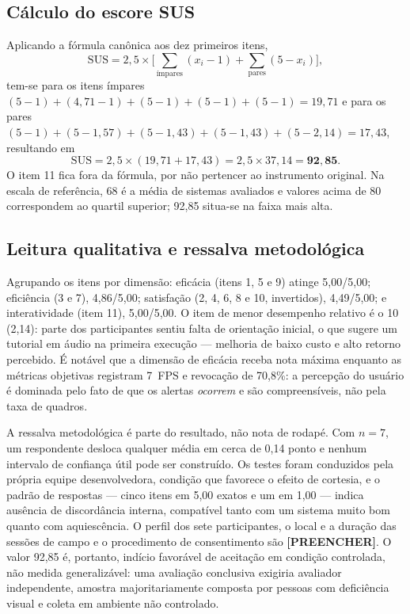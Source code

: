 \documentclass[12pt]{article}
\begin{document}
\subsection{Cálculo do escore SUS}

Aplicando a fórmula canônica aos dez primeiros itens,
\begin{equation}
\mathrm{SUS} = 2{,}5 \times \Big[ \sum_{\text{ímpares}} (x_i - 1)
+ \sum_{\text{pares}} (5 - x_i) \Big],
\end{equation}
tem-se para os itens ímpares
$(5-1)+(4{,}71-1)+(5-1)+(5-1)+(5-1) = 19{,}71$ e para os pares
$(5-1)+(5-1{,}57)+(5-1{,}43)+(5-1{,}43)+(5-2{,}14) = 17{,}43$, resultando em
\begin{equation}
\mathrm{SUS} = 2{,}5 \times (19{,}71 + 17{,}43) = 2{,}5 \times 37{,}14 = \mathbf{92{,}85}.
\end{equation}
O item 11 fica fora da fórmula, por não pertencer ao instrumento original. Na
escala de referência, 68 é a média de sistemas avaliados e valores acima de 80
correspondem ao quartil superior; 92,85 situa-se na faixa mais alta.

\subsection{Leitura qualitativa e ressalva metodológica}

Agrupando os itens por dimensão: eficácia (itens 1, 5 e 9) atinge 5,00/5,00;
eficiência (3 e 7), 4,86/5,00; satisfação (2, 4, 6, 8 e 10, invertidos),
4,49/5,00; e interatividade (item 11), 5,00/5,00. O item de menor desempenho
relativo é o 10 (2,14): parte dos participantes sentiu falta de orientação
inicial, o que sugere um tutorial em áudio na primeira execução --- melhoria
de baixo custo e alto retorno percebido. É notável que a dimensão de eficácia
receba nota máxima enquanto as métricas objetivas registram 7~FPS e revocação
de 70,8\%: a percepção do usuário é dominada pelo fato de que os alertas
\emph{ocorrem} e são compreensíveis, não pela taxa de quadros.

A ressalva metodológica é parte do resultado, não nota de rodapé. Com
$n = 7$, um respondente desloca qualquer média em cerca de 0,14 ponto e nenhum
intervalo de confiança útil pode ser construído. Os testes foram conduzidos
pela própria equipe desenvolvedora, condição que favorece o efeito de
cortesia, e o padrão de respostas --- cinco itens em 5,00 exatos e um em 1,00
--- indica ausência de discordância interna, compatível tanto com um sistema
muito bom quanto com aquiescência. O perfil dos sete participantes, o local e
a duração das sessões de campo e o procedimento de consentimento são
\textbf{[PREENCHER]}. O valor 92,85 é, portanto, indício favorável de
aceitação em condição controlada, não medida generalizável: uma avaliação
conclusiva exigiria avaliador independente, amostra majoritariamente composta
por pessoas com deficiência visual e coleta em ambiente não controlado.
\end{document}
